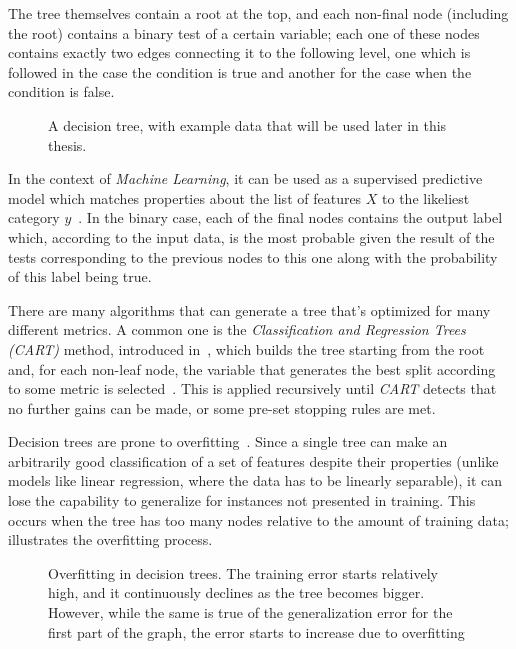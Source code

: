 The tree themselves contain a root at the top, and each non-final node (including the root) contains a binary test of a certain variable; each one of these nodes contains exactly two edges connecting it to the following level, one which is followed in the case the condition is true and another for the case when the condition is false.

\begin{figure}
\centering
{}
\caption{A decision tree, with example data that will be used later in this thesis.}
\label{fig:decision_tree}
\end{figure}

In the context of \emph{Machine Learning}, it can be used as a supervised predictive model which matches properties about the list of features $X$ to the likeliest category $y$~\cite{oded2008decisiontrees}. In the binary case, each of the final nodes contains the output label which, according to the input data, is the most probable given the result of the tests corresponding to the previous nodes to this one along with the probability of this label being true.

There are many algorithms that can generate a tree that's optimized for many different metrics. A common one is the \emph{Classification and Regression Trees (CART)} method, introduced in~\cite{breiman1993classification}, which builds the tree starting from the root and, for each non-leaf node, the variable that generates the best split according to some metric is selected~\cite{loh2011classification}. This is applied recursively until \emph{CART} detects that no further gains can be made, or some pre-set stopping rules are met.

Decision trees are prone to overfitting~\cite{oded2008decisiontrees}. Since a single tree can make an arbitrarily good classification of a set of features despite their properties (unlike models like linear regression, where the data has to be linearly separable), it can lose the capability to generalize for instances not presented in training. This occurs when the tree has too many nodes relative to the amount of training data;  illustrates the overfitting process.

\begin{figure}
\centering
{}
\caption{Overfitting in decision trees. The training error starts relatively high, and it continuously declines as the tree becomes bigger. However, while the same is true of the generalization error for the first part of the graph, the error starts to increase due to overfitting}
\label{fig:decisiontreeoverfitting}
\end{figure}

